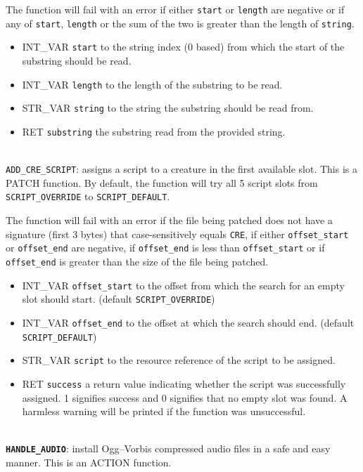 \documentclass{article}
\def\DEFINE#1{{\tt \bf #1}\label{#1}\index{#1}}
\def\t#1{{\tt #1}}
\begin{document}
The function will fail with an error if either \verb+start+ or \verb+length+ are negative or if any of \verb+start+, \verb+length+ or the sum of the two is greater than the length of \verb+string+.
\begin{itemize}
\item INT_VAR \verb+start+ to the string index (0 based) from which the start of the substring should be read.
\item INT_VAR \verb+length+ to the length of the substring to be read.
\item STR_VAR \verb+string+ to the string the substring should be read from.
\item RET \verb+substring+ the substring read from the provided string.
\end{itemize}
\\

\verb+ADD_CRE_SCRIPT+: assigns a script to a creature in the first available slot. This is a PATCH function. By default, the function will try all 5 script slots from \verb+SCRIPT_OVERRIDE+ to \verb+SCRIPT_DEFAULT+.

The function will fail with an error if the file being patched does not have a signature (first 3 bytes) that case-sensitively equals \t{CRE}, if either \verb+offset_start+ or \verb+offset_end+ are negative, if \verb+offset_end+ is less than \verb+offset_start+ or if \verb+offset_end+ is greater than the size of the file being patched.
\begin{itemize}
\item INT_VAR \verb+offset_start+ to the offset from which the search for an empty slot should start. (default \verb+SCRIPT_OVERRIDE+)
\item INT_VAR \verb+offset_end+ to the offset at which the search should end. (default \verb+SCRIPT_DEFAULT+)
\item STR_VAR \verb+script+ to the resource reference of the script to be assigned.
\item RET \verb+success+ a return value indicating whether the script was successfully assigned. 1 signifies success and 0 signifies that no empty slot was found. A harmless warning will be printed if the function was unsuccessful.
\end{itemize}
\\

\DEFINE{\verb+HANDLE_AUDIO+}: install Ogg--Vorbis compressed audio files in a safe and easy manner. This is an ACTION function.

\end{document}
